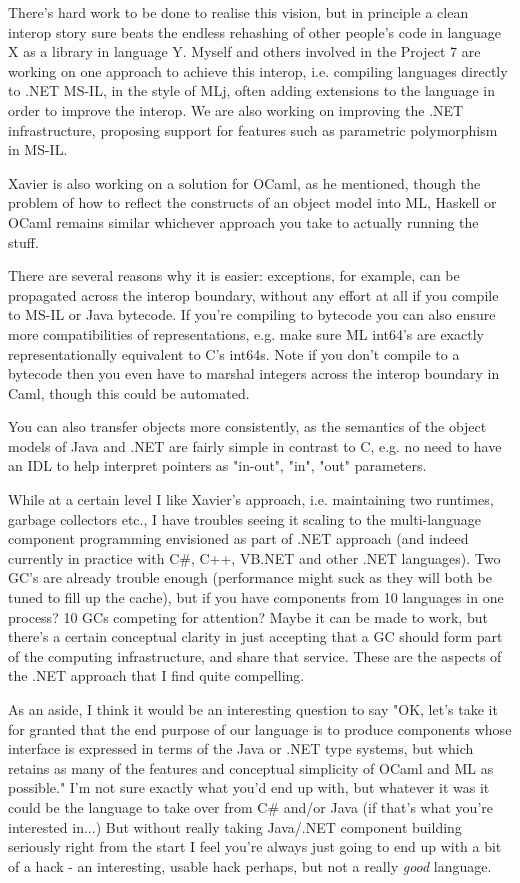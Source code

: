 \documentclass[acmsmall,review]{acmart}\settopmatter{printfolios=true,printccs=false,printacmref=false}
\begin{document}
\begin{verbquote}
There's hard work to be done to realise this vision, but in principle a clean interop story sure beats the endless rehashing of other people's code in language X as a library in language Y.  Myself and others involved in the Project 7 are working on one approach to achieve this interop, i.e. compiling languages directly to .NET MS-IL, in the style of MLj, often adding extensions to the language in order to improve the interop.  We are also working on improving the .NET infrastructure, proposing support for features such as parametric polymorphism in MS-IL.  

Xavier is also working on a solution for OCaml, as he mentioned, though the problem of how to reflect the constructs of an object model into ML, Haskell or OCaml remains similar whichever approach you take to actually running the stuff.

There are several reasons why it is easier: exceptions, for example, can be propagated across the interop boundary, without any effort at all if you compile to MS-IL or Java bytecode.  If you're compiling to bytecode you can also ensure more compatibilities of representations, e.g. make sure ML int64's are exactly representationally equivalent to C's int64s.  Note if you don't compile to a bytecode then you even have to marshal integers across the interop boundary in Caml, though this could be automated.

You can also transfer objects more consistently, as the semantics of the object models of Java and .NET are fairly simple in contrast to C, e.g. no need to have an IDL to help interpret pointers as "in-out", "in", "out" parameters.

While at a certain level I like Xavier's approach, i.e. maintaining two runtimes, garbage collectors etc., I have troubles seeing it scaling to the multi-language component programming envisioned as part of .NET approach (and indeed currently in practice with C\#, C++, VB.NET and other .NET languages).  Two GC's are already trouble enough (performance might suck as they will both be tuned to fill up the cache), but if you have components from 10 languages in one process?  10 GCs competing for attention?  Maybe it can be made to work, but there's a certain conceptual clarity in just accepting that a GC should form part of the computing infrastructure, and share that service.  These are the aspects of the .NET approach that I find quite compelling.

As an aside, I think it would be an interesting question to say "OK, let's take it for granted that the end purpose of our language is to produce components whose interface is expressed in terms of the Java or .NET type systems, but which retains as many of the features and conceptual simplicity of OCaml and ML as possible."  I'm not sure exactly what you'd end up with, but whatever it was it could be the language to take over from C\# and/or Java (if that's what you're interested in...)  But without really taking Java/.NET component building seriously right from the start I feel you're always just going to end up with a bit of a hack - an interesting, usable hack perhaps, but not a really \emph{good} language.


\end{verbquote}
\end{document}
